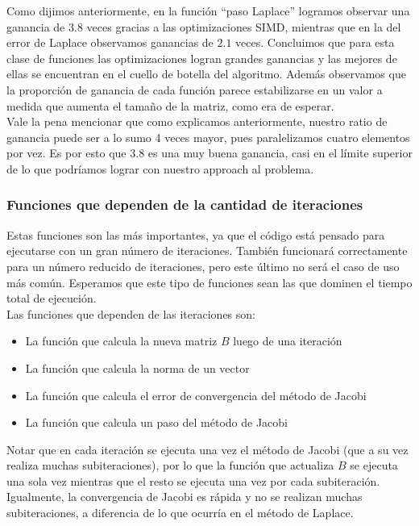 \documentclass[a4paper]{article}
\begin{document}
Como dijimos anteriormente, en la función ``paso Laplace'' logramos 
observar una ganancia de $3.8$ veces gracias a las optimizaciones 
SIMD, mientras que en la del error de Laplace observamos ganancias de $2.1$ veces.
Concluimos que para esta clase de funciones las optimizaciones 
logran grandes ganancias y las mejores de ellas se encuentran 
en el cuello de botella del algoritmo. Además observamos que la proporción de ganancia de cada función 
parece estabilizarse en un valor a medida que aumenta el tamaño 
de la matriz, como era de esperar. \\

Vale la pena mencionar que como explicamos anteriormente, nuestro 
ratio de ganancia puede ser a lo sumo 4 veces mayor, pues paralelizamos 
cuatro elementos por vez. Es por esto que $3.8$ es una muy buena 
ganancia, casi en el límite superior de lo que podríamos lograr con 
nuestro approach al problema.\\

\newpage
\subsubsection{Funciones que dependen de la cantidad de iteraciones}
Estas funciones son las más importantes, ya que el código está pensado 
para ejecutarse con un gran número de iteraciones. 
También funcionará correctamente para un número reducido de iteraciones, 
pero este último no será el caso de uso más común. 
Esperamos que este tipo de funciones sean las que dominen el tiempo total de ejecución.\\

Las funciones que dependen de las iteraciones son:
\begin{itemize}
	\item La función que calcula la nueva matriz $B$ luego de una iteración
	\item La función que calcula la norma de un vector
	\item La función que calcula el error de convergencia del método de Jacobi
	\item La función que calcula un paso del método de Jacobi
\end{itemize}

Notar que en cada iteración se ejecuta una vez el método de Jacobi 
(que a su vez realiza muchas subiteraciones), por lo que la función 
que actualiza $B$ se ejecuta una sola vez mientras que el resto 
se ejecuta una vez por cada subiteración. Igualmente, la convergencia 
de Jacobi es rápida y no se realizan muchas subiteraciones, 
a diferencia de lo que ocurría en el método de Laplace.\\
\end{document}
